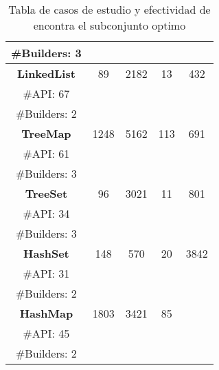 \begin{table}[H]
\begin{tabular}{cccccc}
\multicolumn{2}{c}{\tiny \#Builders: 3} &  &   & &   \\
\midrule
\multicolumn{2}{c}{\textbf{LinkedList}} & 89 &  2182 &  13 &  432 \\
\multicolumn{2}{c}{\tiny \#API: 67} &  &   & &  \\
\multicolumn{2}{c}{\tiny \#Builders: 2} &  &   & &   \\
\midrule
\multicolumn{2}{c}{\textbf{TreeMap}} & 1248  &  5162 &  113 & 691 \\
\multicolumn{2}{c}{\tiny \#API: 61} &  &   & & \\
\multicolumn{2}{c}{\tiny \#Builders: 3} &  &   & &   \\
\midrule
\multicolumn{2}{c}{\textbf{TreeSet}} &  96 & 3021  &  11 & 801  \\
\multicolumn{2}{c}{\tiny \#API: 34} &  &   & &   \\
\multicolumn{2}{c}{\tiny \#Builders: 3} &  &   & &    \\
\midrule
\multicolumn{2}{c}{\textbf{HashSet}} &  148 &  570 & 20  &  3842 \\
\multicolumn{2}{c}{\tiny \#API: 31} &  &   & &   \\
\multicolumn{2}{c}{\tiny \#Builders: 2} &  &   & &    \\
\midrule
\multicolumn{2}{c}{\textbf{HashMap}} &  1803 &  3421 &  85 &   \\
\multicolumn{2}{c}{\tiny \#API: 45} &  &   & &   \\
\multicolumn{2}{c}{\tiny \#Builders: 2} &  &   & &  \\
\hline
\end{tabular}

\caption{Tabla de casos de estudio y efectividad de encontra el subconjunto optimo}
\label{tab:eficiencia}
\end{table}

